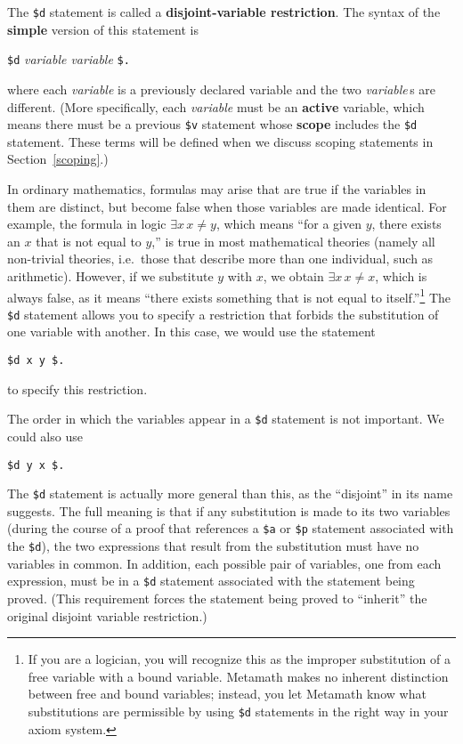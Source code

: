 The \texttt{\$d} statement is called a {\bf disjoint-variable restriction}.  The
syntax of the {\bf simple} version of this statement is
\begin{center}
  \texttt{\$d} {\em variable variable} \texttt{\$.}
\end{center}
where each {\em variable} is a previously declared variable and the two {\em
variable}\,s are different.  (More specifically, each  {\em variable} must be
an {\bf active} variable, which means there must be
a previous \texttt{\$v} statement whose {\bf scope} includes the
\texttt{\$d} statement.  These terms will be defined when we discuss scoping
statements in Section~\ref{scoping}.)

In ordinary mathematics, formulas may arise that are true if the variables in
them are distinct, but become false when those
variables are made identical. For example, the formula in logic $\exists x\,x
\neq y$, which means ``for a given $y$, there exists an $x$ that is not equal
to $y$,'' is true in most mathematical theories (namely all non-trivial
theories, i.e.\ those that describe more than one
individual, such as arithmetic).  However, if we substitute $y$ with $x$, we
obtain $\exists x\,x \neq x$, which is always false, as it means ``there
exists something that is not equal to itself.''\footnote{If you are a
logician, you will recognize this as the improper substitution of a free variable with a bound variable.  Metamath makes no
inherent distinction between free and bound variables; instead, you let
Metamath know what substitutions are permissible by using \texttt{\$d} statements
in the right way in your axiom system.}  The
\texttt{\$d} statement allows you to specify a restriction that forbids the
substitution of one variable with another.  In
this case, we would use the statement
\begin{center}
  \texttt{\$d x y \$.}
\end{center}
to specify this restriction.

The order in which the variables appear in a \texttt{\$d} statement is not
important.  We could also use
\begin{center}
  \texttt{\$d y x \$.}
\end{center}

The \texttt{\$d} statement is actually more general than this, as the
``disjoint'' in its name suggests.  The full meaning
is that if any substitution is made to its two variables (during the
course of a proof that references a \texttt{\$a} or \texttt{\$p} statement
associated with the \texttt{\$d}), the two expressions that result from the
substitution must have no variables in common.  In addition, each possible
pair of variables, one from each expression, must be in a \texttt{\$d} statement
associated with the statement being proved.  (This requirement forces the
statement being proved to ``inherit'' the original disjoint variable
restriction.)

